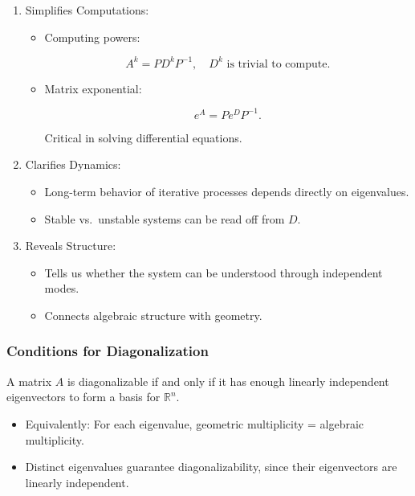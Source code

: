 \documentclass[
  letterpaper,
  DIV=11,
  numbers=noendperiod]{scrreprt}
\providecommand{\tightlist}{%
  \setlength{\itemsep}{0pt}\setlength{\parskip}{0pt}}
\begin{document}
\begin{enumerate}
\def\labelenumi{\arabic{enumi}.}
\item
  Simplifies Computations:

  \begin{itemize}
  \item
    Computing powers:

    \[
    A^k = P D^k P^{-1}, \quad D^k \text{ is trivial to compute}.
    \]
  \item
    Matrix exponential:

    \[
    e^A = P e^D P^{-1}.
    \]

    Critical in solving differential equations.
  \end{itemize}
\item
  Clarifies Dynamics:

  \begin{itemize}
  \tightlist
  \item
    Long-term behavior of iterative processes depends directly on
    eigenvalues.
  \item
    Stable vs.~unstable systems can be read off from \(D\).
  \end{itemize}
\item
  Reveals Structure:

  \begin{itemize}
  \tightlist
  \item
    Tells us whether the system can be understood through independent
    modes.
  \item
    Connects algebraic structure with geometry.
  \end{itemize}
\end{enumerate}

\subsubsection{Conditions for
Diagonalization}\label{conditions-for-diagonalization}

A matrix \(A\) is diagonalizable if and only if it has enough linearly
independent eigenvectors to form a basis for \(\mathbb{R}^n\).

\begin{itemize}
\tightlist
\item
  Equivalently: For each eigenvalue, geometric multiplicity = algebraic
  multiplicity.
\item
  Distinct eigenvalues guarantee diagonalizability, since their
  eigenvectors are linearly independent.
\end{itemize}
\end{document}

